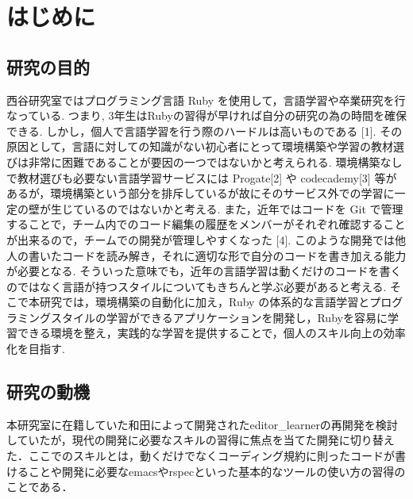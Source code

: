 \chapter{はじめに}\label{ux306fux3058ux3081ux306b}

    \section{研究の目的}\label{ux7814ux7a76ux306eux76eeux7684}

    西谷研究室ではプログラミング言語 Ruby を使用して，言語学習や卒業研究を行なっている. つまり, 3年生はRubyの習得が早ければ自分の研究の為の時間を確保できる. しかし，個人で言語学習を行う際のハードルは高いものである [1]. その原因として，言語に対しての知識がない初心者にとって環境構築や学習の教材選びは非常に困難であることが要因の一つではないかと考えられる. 環境構築なしで教材選びも必要ない言語学習サービスには Progate[2] や codecademy[3] 等があるが，環境構築という部分を排斥しているが故にそのサービス外での学習に一定の壁が生じているのではないかと考える.
また，近年ではコードを Git で管理することで，チーム内でのコード編集の履歴をメンバーがそれぞれ確認することが出来るので，チームでの開発が管理しやすくなった [4]. このような開発では他人の書いたコードを読み解き，それに適切な形で自分のコードを書き加える能力が必要となる. そういった意味でも，近年の言語学習は動くだけのコードを書くのではなく言語が持つスタイルについてもきちんと学ぶ必要があると考える.
そこで本研究では，環境構築の自動化に加え，Ruby の体系的な言語学習とプログラミングスタイルの学習ができるアプリケーションを開発し，Rubyを容易に学習できる環境を整え，実践的な学習を提供することで，個人のスキル向上の効率化を目指す.


    \section{研究の動機}\label{ux7814ux7a76ux306eux52d5ux6a5f}

    本研究室に在籍していた和田によって開発されたeditor\_learnerの再開発を検討していたが，現代の開発に必要なスキルの習得に焦点を当てた開発に切り替えた．ここでのスキルとは，動くだけでなくコーディング規約に則ったコードが書けることや開発に必要なemacsやrspecといった基本的なツールの使い方の習得のことである．

    
